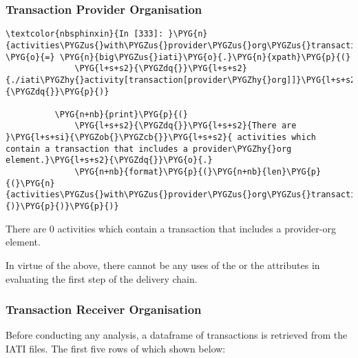 \documentclass[letterpaper,10pt,english]{sphinxmanual}
\begin{document}
\subsubsection{Transaction Provider Organisation}
\label{\detokenize{Global Affairs Canada - Compliance Report:Transaction-Provider-Organisation}}
\begin{Verbatim}[commandchars=\\\{\}]
\textcolor{nbsphinxin}{In [333]: }\PYG{n}{activities\PYGZus{}with\PYGZus{}provider\PYGZus{}org\PYGZus{}transactions} \PYG{o}{=} \PYG{n}{big\PYGZus{}iati}\PYG{o}{.}\PYG{n}{xpath}\PYG{p}{(}
              \PYG{l+s+s2}{\PYGZdq{}}\PYG{l+s+s2}{./iati\PYGZhy{}activity[transaction[provider\PYGZhy{}org]]}\PYG{l+s+s2}{\PYGZdq{}}\PYG{p}{)}
          
          \PYG{n+nb}{print}\PYG{p}{(}
              \PYG{l+s+s2}{\PYGZdq{}}\PYG{l+s+s2}{There are }\PYG{l+s+si}{\PYGZob{}\PYGZcb{}}\PYG{l+s+s2}{ activities which contain a transaction that includes a provider\PYGZhy{}org element.}\PYG{l+s+s2}{\PYGZdq{}}\PYG{o}{.}
              \PYG{n+nb}{format}\PYG{p}{(}\PYG{n+nb}{len}\PYG{p}{(}\PYG{n}{activities\PYGZus{}with\PYGZus{}provider\PYGZus{}org\PYGZus{}transactions}\PYG{p}{)}\PYG{p}{)}\PYG{p}{)}
\end{Verbatim}
%
\begin{OriginalVerbatim}[commandchars=\\\{\}]
There are 0 activities which contain a transaction that includes a provider-org element.
\end{OriginalVerbatim}
\relax
In virtue of the above, there cannot be any uses of the
 or the 
attributes in evaluating the first step of the delivery chain.


\subsubsection{Transaction Receiver Organisation}
\label{\detokenize{Global Affairs Canada - Compliance Report:Transaction-Receiver-Organisation}}
Before conducting any analysis, a dataframe of transactions is retrieved
from the IATI files. The first five rows of which shown below:
\end{document}
